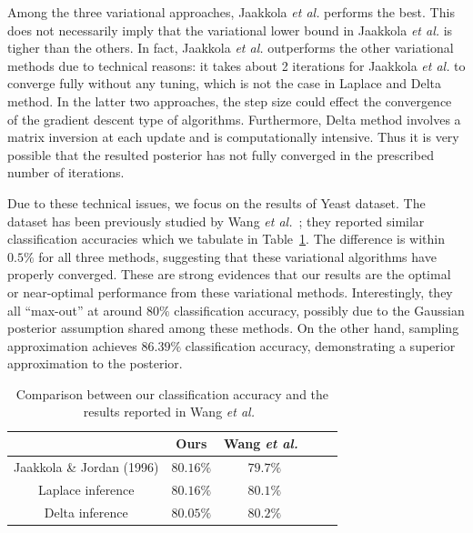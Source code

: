 Among the three variational approaches, Jaakkola {\it et al.} performs the
best. This does not necessarily imply that the variational lower bound in
Jaakkola {\it et al.} is tigher than the others. In fact, Jaakkola {\it et
al.} outperforms the other variational methods due to technical reasons: it
takes about 2 iterations for Jaakkola {\it et al.} to converge fully without
any tuning, which is not the case in Laplace and Delta method. In the latter
two approaches, the step size could effect the convergence of the gradient
descent type of algorithms. Furthermore, Delta method involves a matrix
inversion at each update and is computationally intensive. Thus it is very
possible that the resulted posterior has not fully converged in the prescribed
number of iterations. 

Due to these technical issues, we focus on the results of Yeast dataset. The
dataset has been previously studied by Wang {\it et al.}~\cite{Wang13}; they
reported similar classification accuracies which we tabulate in
Table~\ref{tab:compare_wang}. The difference is within $0.5\%$ for all three
methods, suggesting that these variational algorithms have properly converged.
These are strong evidences that our results are the optimal or near-optimal
performance from these variational methods. Interestingly, they all
``max-out'' at around $80\%$ classification accuracy, possibly due to the
Gaussian posterior assumption shared among these methods. On the other hand,
sampling approximation achieves $86.39\%$ classification accuracy,
demonstrating a superior approximation to the posterior.


\begin{table}
\label{tab:compare_wang}
\begin{center}
\begin{tabular}{| c | c |  c | c | c |}
  \hline
   & Ours  & Wang {\it et al.}~\cite{Wang13} \\
  \hline
  Jaakkola \& Jordan (1996) & $80.16\%$ & $79.7\%$ \\
  \hline
  Laplace inference & $80.16\%$ & $80.1\%$ \\
  \hline
  Delta inference & $80.05\%$ & $80.2\%$ \\
  \hline
\end{tabular}
\end{center}

\caption{Comparison between our classification accuracy and the results
reported in Wang {\it et al.}~\cite{Wang13}}
\end{table}


